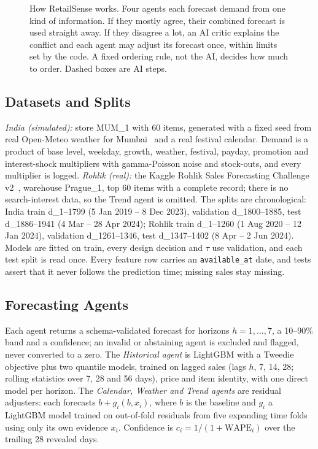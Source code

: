 \documentclass[conference]{IEEEtran}
\begin{document}
\begin{figure}[t]
\caption{How RetailSense works. Four agents each forecast demand from one kind of information. If
they mostly agree, their combined forecast is used straight away. If they disagree a lot, an AI
critic explains the conflict and each agent may adjust its forecast once, within limits set by the
code. A fixed ordering rule, not the AI, decides how much to order. Dashed boxes are AI steps.}
\label{fig:system}
\end{figure}

\subsection{Datasets and Splits}
\emph{India (simulated):} store MUM\_1 with 60 items, generated with a fixed seed from real
Open-Meteo weather for Mumbai~\cite{openmeteo} and a real festival calendar. Demand is a product of
base level, weekday, growth, weather, festival, payday, promotion and interest-shock multipliers with
gamma-Poisson noise and stock-outs, and every multiplier is logged. \emph{Rohlik (real):} the Kaggle
Rohlik Sales Forecasting Challenge v2~\cite{rohlik}, warehouse Prague\_1, top 60 items with a complete
record; there is no search-interest data, so the Trend agent is omitted. The splits are chronological:
India train d\_1--1799 (5 Jan 2019 -- 8 Dec 2023), validation d\_1800--1885, test d\_1886--1941
(4 Mar -- 28 Apr 2024); Rohlik train d\_1--1260 (1 Aug 2020 -- 12 Jan 2024), validation
d\_1261--1346, test d\_1347--1402 (8 Apr -- 2 Jun 2024). Models are fitted on train, every design decision and $\tau$ use
validation, and each test split is read once. Every feature row carries an \texttt{available\_at}
date, and tests assert that it never follows the prediction time; missing sales stay missing.

\subsection{Forecasting Agents}
Each agent returns a schema-validated forecast for horizons $h=1,\dots,7$, a 10--90\% band and a
confidence; an invalid or abstaining agent is excluded and flagged, never converted to a zero. The
\emph{Historical agent} is LightGBM with a Tweedie objective plus two quantile models, trained on
lagged sales (lags $h$, 7, 14, 28; rolling statistics over 7, 28 and 56 days), price and item
identity, with one direct model per horizon. The \emph{Calendar, Weather and Trend agents} are
residual adjusters: each forecasts $b+g_i(b,x_i)$, where $b$ is the baseline and $g_i$ a LightGBM
model trained on out-of-fold residuals from five expanding time folds using only its own evidence
$x_i$. Confidence is $c_i=1/(1+\mathrm{WAPE}_i)$ over the trailing 28 revealed days.
\end{document}
